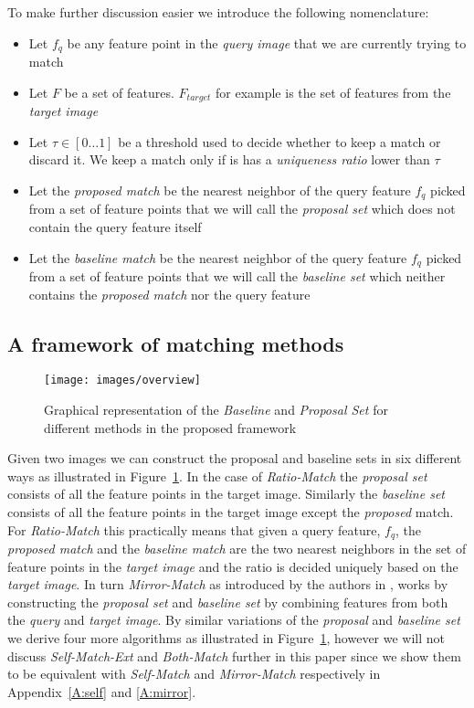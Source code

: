 \documentclass[journal]{IEEEtran}
\begin{document}
To make further discussion easier we introduce the following 
nomenclature:

\begin{itemize}
\item{Let $f_q$ be any feature point in the \emph{query image} that we 
    are currently trying to match}
\item{Let $F$ be a set of features. $F_{target}$ for example is the set 
    of features from the \emph{target image}}
\item{Let $\tau \in [0 \ldots 1]$ be a threshold used to decide whether 
    to keep a match or discard it. We keep a match only if is has a 
\emph{uniqueness ratio} lower than $\tau$}
\item{Let the \emph{proposed match} be the nearest neighbor of the query 
    feature $f_q$ picked from a set of feature points that we will call 
the \emph{proposal set} which does not contain the query feature itself}
\item{Let the \emph{baseline match} be the nearest neighbor of the query 
    feature $f_q$ picked from a set of feature points that we will call 
the \emph{baseline set} which neither contains the \emph{proposed match} 
nor the query feature}
\end{itemize}

%
\subsection{A framework of matching methods}
%

\begin{figure}[t]
\centering
\texttt{[image: images/overview]}
\caption{Graphical representation of the \emph{Baseline} and 
\emph{Proposal Set} for different methods in the proposed framework}
\label{fig:overview}
\end{figure}

Given two images we can construct the proposal and baseline sets in six 
different ways as illustrated in Figure~\ref{fig:overview}. In the case 
of \emph{Ratio-Match} \cite{lowe2004sift} the \emph{proposal set} 
consists of all the feature points in the target image.  Similarly the 
\emph{baseline set} consists of all the feature points in the target 
image except the \emph{proposed} match. For \emph{Ratio-Match} this 
practically means that given a query feature, $f_q$, the \emph{proposed 
match} and the \emph{baseline match} are the two nearest neighbors in 
the set of feature points in the \emph{target image} and the ratio is 
decided uniquely based on the \emph{target image}. In turn 
\emph{Mirror-Match} as introduced by the authors in 
\cite{arnfred2013mirror}, works by constructing the \emph{proposal set} 
and \emph{baseline set} by combining features from both the \emph{query} 
and \emph{target image}. By similar variations of the \emph{proposal} 
and \emph{baseline set} we derive four more algorithms as illustrated in 
Figure~\ref{fig:overview}, however we will not discuss 
\emph{Self-Match-Ext} and \emph{Both-Match} further in this paper since 
we show them to be equivalent with \emph{Self-Match} and 
\emph{Mirror-Match} respectively in Appendix~\ref{A:self} and 
\ref{A:mirror}.
\end{document}
